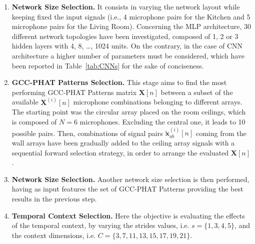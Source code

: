 \documentclass[review]{elsarticle}
\newcommand{\tableref}[1]{Table~\ref{#1}}
\begin{document}
\begin{enumerate}
	\item{\textbf{Network Size Selection.}}  It consists in varying the network layout while keeping fixed the input signals (i.e., 4 microphone pairs for the Kitchen and 5 microphone pairs for the Living Room). 
	Concerning the MLP architecture, 30 different network topologies have been investigated, composed of 1, 2 or 3 hidden layers with 4, 8, \dots, 1024 units. 
	On the contrary, in the case of CNN architecture a higher number of parameters must be considered, which have been reported in \tableref{tab:CNNs} for the sake of conciseness. 
	\item{\textbf{GCC-PHAT Patterns Selection.}} This stage aims to find the most performing GCC-PHAT Patterns matrix $\mathbf{X}[n]$ between a subset of the available $\mathbf{X}^{(i)}[n]$ microphone combinations belonging to different arrays.
	The starting point was the circular array placed on the room ceilings, which is composed of $N = 6$ microphones. Excluding the central one, it leads to 10 possible pairs. Then, combinations of signal pairs $\mathbf{\tilde{x}}_{ab}^{(i)}[n]$ coming from the wall arrays have been gradually added to the ceiling array signals with a sequential forward selection strategy, in order to arrange the evaluated $\mathbf{X}[n]$.
	\item{\textbf{Network Size Selection.}} Another network size selection is then performed, having as input features the set of GCC-PHAT Patterns providing the best results in the previous step. 
	\item{\textbf{Temporal Context Selection.}} Here the objective is evaluating the effects of the temporal context, by varying the strides values, i.e. $s=\{1,3,4,5\}$, and the context dimensions, i.e. $C=\{3,7,11,13,15,17,19,21\}$.
\end{enumerate}
\end{document}
